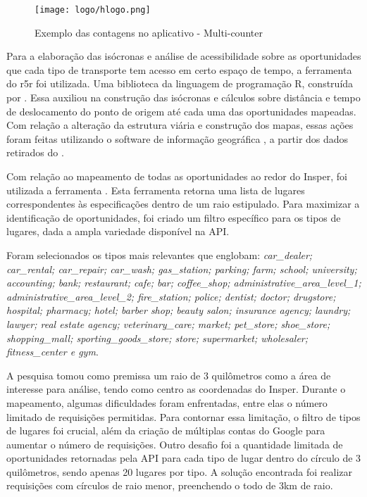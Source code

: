 \begin{figure}[H]
    \centering
    \texttt{[image: logo/hlogo.png]}
    \caption{Exemplo das contagens no aplicativo - Multi-counter}
    \label{fig:app}
\end{figure}

Para a elaboração das isócronas e análise de acessibilidade sobre as oportunidades que cada tipo de transporte tem acesso em certo espaço de tempo, a ferramenta do r5r foi utilizada. Uma biblioteca da linguagem de programação R, construída por \textcite{pereira_r5r_2021}. Essa auxiliou na construção das isócronas e cálculos sobre distância e tempo de deslocamento do ponto de origem até cada uma das oportunidades mapeadas. Com relação a alteração da estrutura viária e construção dos mapas, essas ações foram feitas utilizando o software de informação geográfica , a partir dos dados retirados do .

Com relação ao mapeamento de todas as oportunidades ao redor do Insper, foi utilizada a ferramenta . Esta ferramenta retorna uma lista de lugares correspondentes às especificações dentro de um raio estipulado. Para maximizar a identificação de oportunidades, foi criado um filtro específico para os tipos de lugares, dada a ampla variedade disponível na API. 

Foram selecionados os tipos mais relevantes que englobam: \textit{car\_dealer;
car\_rental; car\_repair; car\_wash; gas\_station; parking; farm; school; university; accounting; bank; restaurant; cafe; bar; coffee\_shop; administrative\_area\_level\_1; administrative\_area\_level\_2; fire\_station; police; dentist; doctor; drugstore; hospital; pharmacy; hotel; barber shop; beauty salon; insurance agency; laundry; lawyer; real estate agency; veterinary\_care; market; pet\_store; shoe\_store; shopping\_mall; sporting\_goods\_store; store; supermarket; wholesaler; fitness\_center e gym}.


A pesquisa tomou como premissa um raio de 3 quilômetros como a área de interesse para análise, tendo como centro as coordenadas do Insper. Durante o mapeamento, algumas dificuldades foram enfrentadas, entre elas o número limitado de requisições permitidas. Para contornar essa limitação, o filtro de tipos de lugares foi crucial, além da criação de múltiplas contas do Google para aumentar o número de requisições. Outro desafio foi a quantidade limitada de oportunidades retornadas pela API para cada tipo de lugar dentro do círculo de 3 quilômetros, sendo apenas 20 lugares por tipo. A solução encontrada foi realizar requisições com círculos de raio menor, preenchendo o todo de 3km de raio. 

